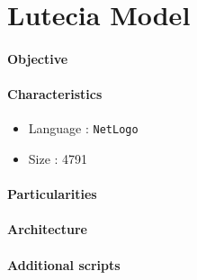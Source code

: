 
\newpage

\section{Lutecia Model}




\paragraph{Objective}

\paragraph{Characteristics}

\begin{itemize}
\item Language : \texttt{NetLogo}
\item Size : 4791
\end{itemize}


\paragraph{Particularities}

\paragraph{Architecture}

\paragraph{Additional scripts}




